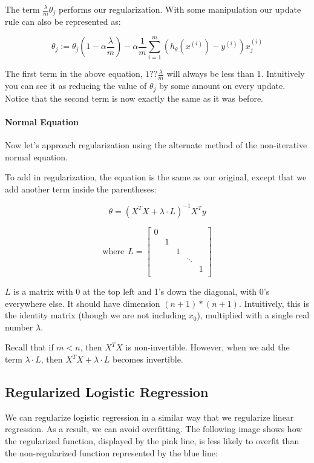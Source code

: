 \documentclass[UTF8]{article}
\begin{document}
The term $\frac{\lambda}{m}\theta_j$ performs our regularization. With some manipulation our update rule can also be represented as:

\[ \theta_j := \theta_j(1 - \alpha\frac{\lambda}{m}) - \alpha\frac{1}{m}\sum_{i=1}^m(h_\theta(x^{(i)}) - y^{(i)})x_j^{(i)} \]

The first term in the above equation, $1??\frac{\lambda}{m}$ will always be less than 1. Intuitively you can see it as reducing the value of $\theta_j$ by some amount on every update. Notice that the second term is now exactly the same as it was before.

\paragraph{Normal Equation}

Now let's approach regularization using the alternate method of the non-iterative normal equation.

To add in regularization, the equation is the same as our original, except that we add another term inside the parentheses:

\[ \theta = \left( X^TX + \lambda \cdot L \right)^{-1} X^Ty \]

\[ \text{where}\ \ L = \begin{bmatrix} 0 & & & & \\ & 1 & & & \\ & & 1 & & \\ & & & \ddots & \\ & & & & 1 \\\end{bmatrix}\]

$L$ is a matrix with 0 at the top left and 1's down the diagonal, with 0's everywhere else. It should have dimension $(n+1)*(n+1)$. Intuitively, this is the identity matrix (though we are not including $x_0$), multiplied with a single real number $\lambda$.

Recall that if $m < n$, then $X^TX$ is non-invertible. However, when we add the term $\lambda \cdot L$, then $X^TX + \lambda \cdot L$ becomes invertible.

\subsection{Regularized Logistic Regression}

We can regularize logistic regression in a similar way that we regularize linear regression. As a result, we can avoid overfitting. The following image shows how the regularized function, displayed by the pink line, is less likely to overfit than the non-regularized function represented by the blue line:
\end{document}

